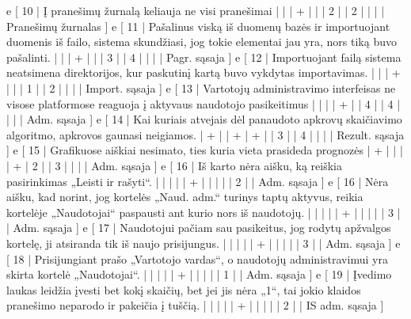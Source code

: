{  e [ 10  | Į pranešimų žurnalą keliauja ne visi pranešimai     
                    |   |   | + |   |   | 2 |   | 2 |   |   |      | Pranešimų žurnalas ]
  e [ 11  | Pašalinus viską iš duomenų bazės ir importuojant duomenis iš failo,
  sistema skundžiasi, jog tokie elementai jau yra, nors tiką buvo pašalinti.     
                    |   |   | + |   |   | 3 |   | 4 |   |   |      | Pagr. sąsaja ]
  e [ 12  | Importuojant failą sistema neatsimena direktorijos, kur paskutinį
  kartą buvo vykdytas importavimas.   
                    |   |   | + |   |   | 1 |   | 2 |   |   |      | Import. sąsaja ]
  e [ 13  | Vartotojų administravimo interfeisas ne visose platformose reaguoja į
  aktyvaus naudotojo pasikeitimus  
                    |   |   |   | + |   | 4 |   | 4 |   |   |      | Adm. sąsaja ]
  e [ 14  | Kai kuriais atvejais dėl panaudoto apkrovų skaičiavimo algoritmo,
  apkrovos gaunasi neigiamos.
                    | + |   | + | + |   | 3 |   | 4 |   |   |      | Rezult. sąsaja ]
  e [ 15 | Grafikuose aiškiai nesimato, ties kuria vieta prasideda prognozės
                    | + |   |   |   | + | 2 |   | 3 |   |   |      | Adm. sąsaja ]
  e [ 16 | Iš karto nėra aišku, ką reiškia pasirinkimas „Leisti ir rašyti“.
                    |   |   |   |   | + |   |   |   |   | 2 |      | Adm. sąsaja ]
  e [ 16 | Nėra aišku, kad norint, jog kortelės „Naud. adm.“ turinys taptų aktyvus,
  reikia kortelėje „Naudotojai“ paspausti ant kurio nors iš naudotojų.
                    |   |   |   |   | + |   |   |   |   | 3 |      | Adm. sąsaja ]
  e [ 17 | Naudotojui pačiam sau pasikeitus, jog rodytų apžvalgos kortelę, ji
  atsiranda tik iš naujo prisijungus.
                    |   |   |   |   | + |   |   |   |   | 3 |      | Adm. sąsaja ]
  e [ 18 | Prisijungiant prašo „Vartotojo vardas“, o naudotojų administravimui
  yra skirta kortelė „Naudotojai“.
                    |   |   |   |   | + |   |   |   |   | 1 |      | Adm. sąsaja ]
  e [ 19 | Įvedimo laukas leidžia įvesti bet kokį skaičių, bet jei jis nėra
  „1“, tai jokio klaidos pranešimo neparodo ir pakeičia į tuščią.
                    |   |   |   |   | + |   |   |   |   | 2 |      | IS adm. sąsaja ]
}
